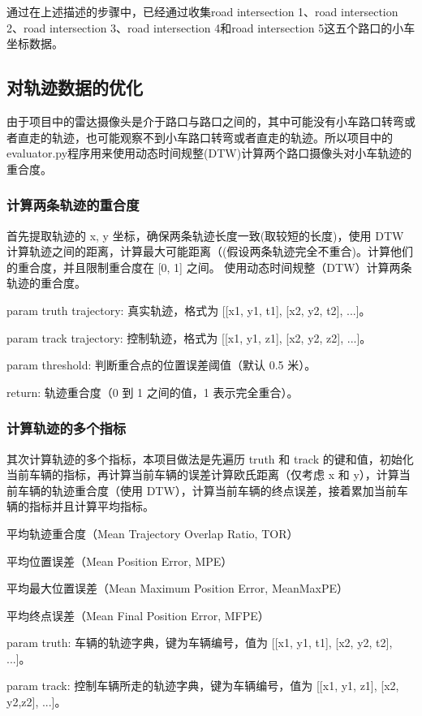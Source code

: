 通过在上述描述的步骤中，已经通过收集road intersection 1、road intersection 2、road intersection 3、road intersection 4和road intersection 5这五个路口的小车坐标数据。


\subsection{对轨迹数据的优化}
由于项目中的雷达摄像头是介于路口与路口之间的，其中可能没有小车路口转弯或者直走的轨迹，也可能观察不到小车路口转弯或者直走的轨迹。所以项目中的evaluator.py程序用来使用动态时间规整(DTW)计算两个路口摄像头对小车轨迹的重合度。
\subsubsection{计算两条轨迹的重合度}
首先提取轨迹的 x, y 坐标，确保两条轨迹长度一致(取较短的长度)，使用 DTW 计算轨迹之间的距离，计算最大可能距离（(假设两条轨迹完全不重合)。计算他们的重合度，并且限制重合度在 [0, 1] 之间。
使用动态时间规整（DTW）计算两条轨迹的重合度。

param truth trajectory: 真实轨迹，格式为 [[x1, y1, t1], [x2, y2, t2], ...]。

param track trajectory: 控制轨迹，格式为 [[x1, y1, z1], [x2, y2, z2], ...]。

param threshold: 判断重合点的位置误差阈值（默认 0.5 米）。

return: 轨迹重合度（0 到 1 之间的值，1 表示完全重合）。

\subsubsection{计算轨迹的多个指标}
其次计算轨迹的多个指标，本项目做法是先遍历 truth 和 track 的键和值，初始化当前车辆的指标，再计算当前车辆的误差计算欧氏距离（仅考虑 x 和 y），计算当前车辆的轨迹重合度（使用 DTW），计算当前车辆的终点误差，接着累加当前车辆的指标并且计算平均指标。

平均轨迹重合度（Mean Trajectory Overlap Ratio, TOR）

平均位置误差（Mean Position Error, MPE）

平均最大位置误差（Mean Maximum Position Error, MeanMaxPE）

平均终点误差（Mean Final Position Error, MFPE）

param truth: 车辆的轨迹字典，键为车辆编号，值为 [[x1, y1, t1], [x2, y2, t2], ...]。

param track: 控制车辆所走的轨迹字典，键为车辆编号，值为 [[x1, y1, z1], [x2, y2,z2], ...]。

